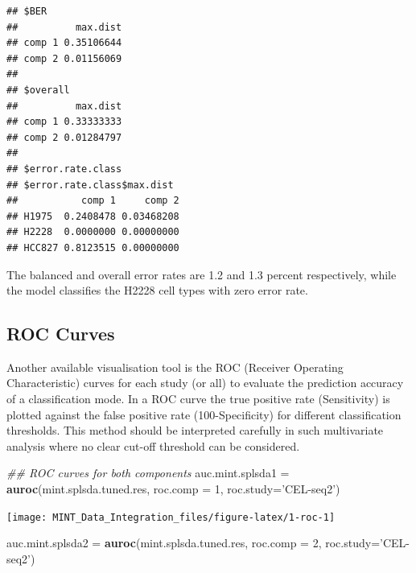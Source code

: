 \documentclass[]{book}
\newenvironment{Shaded}{\begin{snugshade}}{\end{snugshade}}
\newcommand{\CommentTok}[1]{\textcolor[rgb]{0.56,0.35,0.01}{\textit{#1}}}
\newcommand{\DataTypeTok}[1]{\textcolor[rgb]{0.13,0.29,0.53}{#1}}
\newcommand{\DecValTok}[1]{\textcolor[rgb]{0.00,0.00,0.81}{#1}}
\newcommand{\KeywordTok}[1]{\textcolor[rgb]{0.13,0.29,0.53}{\textbf{#1}}}
\newcommand{\NormalTok}[1]{#1}
\newcommand{\StringTok}[1]{\textcolor[rgb]{0.31,0.60,0.02}{#1}}
\theoremstyle{definition}
\theoremstyle{definition}
\theoremstyle{definition}
\theoremstyle{remark}
\begin{document}
\begin{verbatim}
## $BER
##          max.dist
## comp 1 0.35106644
## comp 2 0.01156069
## 
## $overall
##          max.dist
## comp 1 0.33333333
## comp 2 0.01284797
## 
## $error.rate.class
## $error.rate.class$max.dist
##           comp 1     comp 2
## H1975  0.2408478 0.03468208
## H2228  0.0000000 0.00000000
## HCC827 0.8123515 0.00000000
\end{verbatim}

The balanced and overall error rates are 1.2 and 1.3 percent
respectively, while the model classifies the H2228 cell types with zero
error rate.

\hypertarget{roc-curves}{%
\subsection{ROC Curves}\label{roc-curves}}

Another available visualisation tool is the ROC (Receiver Operating
Characteristic) curves for each study (or all) to evaluate the
prediction accuracy of a classification mode. In a ROC curve the true
positive rate (Sensitivity) is plotted against the false positive rate
(100-Specificity) for different classification thresholds. This method
should be interpreted carefully in such multivariate analysis where no
clear cut-off threshold can be considered.

\begin{Shaded}
\begin{Highlighting}[]
\CommentTok{## ROC curves for both components}
\NormalTok{auc.mint.splsda1 =}\StringTok{ }\KeywordTok{auroc}\NormalTok{(mint.splsda.tuned.res, }\DataTypeTok{roc.comp =} \DecValTok{1}\NormalTok{, }\DataTypeTok{roc.study=}\StringTok{'CEL-seq2'}\NormalTok{)}
\end{Highlighting}
\end{Shaded}

\begin{center}\texttt{[image: MINT\_Data\_Integration\_files/figure-latex/1-roc-1]} \end{center}

\begin{Shaded}
\begin{Highlighting}[]
\NormalTok{auc.mint.splsda2 =}\StringTok{ }\KeywordTok{auroc}\NormalTok{(mint.splsda.tuned.res, }\DataTypeTok{roc.comp =} \DecValTok{2}\NormalTok{, }\DataTypeTok{roc.study=}\StringTok{'CEL-seq2'}\NormalTok{)}
\end{Highlighting}
\end{Shaded}
\end{document}
